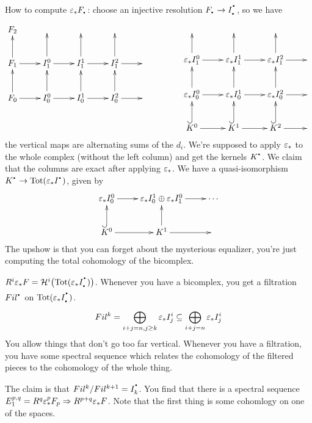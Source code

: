 How to compute $\e_*F_\udot$: choose an injective resolution $F_\udot \to I_\udot^\udot$, so we have
 \[\xymatrix{
   F_2 & {} & {} & {} \\
   F_1\ar[u]\ar[r] & I_1^0\ar[r]\ar[u] & I^1_1 \ar[r]\ar[u] & I_1^2\ar[r]\ar[u] & {} \\
   F_0\ar[u]\ar[r] & I_0^0 \ar[r]\ar[u] & I_0^1\ar[r]\ar[u] & I_0^2\ar[r]\ar[u] & {}
 }\qquad\qquad\xymatrix{
   {} & {} & {} \\
   \e_*I_1^0\ar[r]\ar[u] & \e_*I^1_1 \ar[r]\ar[u] & \e_*I_1^2\ar[r]\ar[u] & {} \\
   \e_*I_0^0 \ar[r]\ar[u] & \e_*I_0^1\ar[r]\ar[u] & \e_*I_0^2\ar[r]\ar[u] & {} \\
   K^0\ar[r]\ar@{^(->}[u] & K^1\ar[r]\ar@{^(->}[u] & K^2\ar@{^(->}[u]\ar[r] & {}
 }\]
the vertical maps are alternating sums of the $d_i$. We're supposed to apply $\varepsilon_*$ to the whole complex (without the left column) and get the kernels $K^\udot$. We claim that the columns are exact after applying $\varepsilon_*$. We have a quasi-isomorphism $K^\udot\to \tot(\e_*I^\udot)$, given by
\[\xymatrix{
  \e_*I^0_0 \ar[r] &\e_* I^1_0\oplus \e_* I^0_1\ar[r]& \cdots\\
  K^0\ar@{^(->}[u] \ar[r] & K^1 \ar[u] \ar[r] &
}\]
The upshow is that you can forget about the mysterious equalizer, you're just computing the total cohomology of the bicomplex.

$R^i\e_*F=\mathcal{H}^i\bigl(\tot(\e_*I^\udot_\udot)\bigr)$. Whenever you have a bicomplex, you get a filtration $Fil^\udot$ on $\tot(\e_*I_\udot^\udot)$.
\[
  Fil^k=\bigoplus_{i+j=n,j\ge k} \varepsilon_* I^i_j \subseteq
  \bigoplus_{i+j=n}\varepsilon_* I^i_j
\]
You allow things that don't go too far vertical.
Whenever you have a filtration, you have some spectral sequence which relates the cohomology of the filtered pieces to the cohomology of the whole thing. \cite[XX.9.3]{Lang:Algebra}

The claim is that $Fil^k/Fil^{k+1}=I^\udot_k$. You find that there is a spectral sequence $E^{p,q}_1=R^q\varepsilon_*^p F_p\Rightarrow R^{p+q}\varepsilon_* F$. Note that the first thing is some cohomlogy on one of the spaces.





